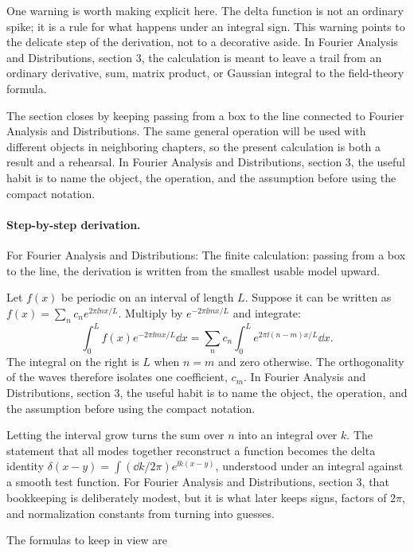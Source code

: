 One warning is worth making explicit here.  The delta function is not an ordinary spike; it is a rule for what happens under an integral sign.  This warning points to the delicate step of the derivation, not to a decorative aside.  In Fourier Analysis and Distributions, section 3, the calculation is meant to leave a trail from an ordinary derivative, sum, matrix product, or Gaussian integral to the field-theory formula.

The section closes by keeping passing from a box to the line connected to Fourier Analysis and Distributions.  The same general operation will be used with different objects in neighboring chapters, so the present calculation is both a result and a rehearsal.  In Fourier Analysis and Distributions, section 3, the useful habit is to name the object, the operation, and the assumption before using the compact notation.



\paragraph{Step-by-step derivation.}

For Fourier Analysis and Distributions: The finite calculation: passing from a box to the line, the derivation is written from the smallest usable model upward.

Let \(f(x)\) be periodic on an interval of length \(L\).  Suppose it can be written as \(f(x)=\sum_n c_ne^{2\pi\ii nx/L}\).  Multiply by \(e^{-2\pi\ii mx/L}\) and integrate:
\[
  \int_0^L f(x)e^{-2\pi\ii mx/L}\dd x
  =
  \sum_n c_n\int_0^L e^{2\pi\ii(n-m)x/L}\dd x.
\]
The integral on the right is \(L\) when \(n=m\) and zero otherwise.  The orthogonality of the waves therefore isolates one coefficient, \(c_m\).  In Fourier Analysis and Distributions, section 3, the useful habit is to name the object, the operation, and the assumption before using the compact notation.

Letting the interval grow turns the sum over \(n\) into an integral over \(k\).  The statement that all modes together reconstruct a function becomes the delta identity \(\delta(x-y)=\int(\dd k/2\pi)e^{\ii k(x-y)}\), understood under an integral against a smooth test function.  For Fourier Analysis and Distributions, section 3, that bookkeeping is deliberately modest, but it is what later keeps signs, factors of \(2\pi\), and normalization constants from turning into guesses.

The formulas to keep in view are

